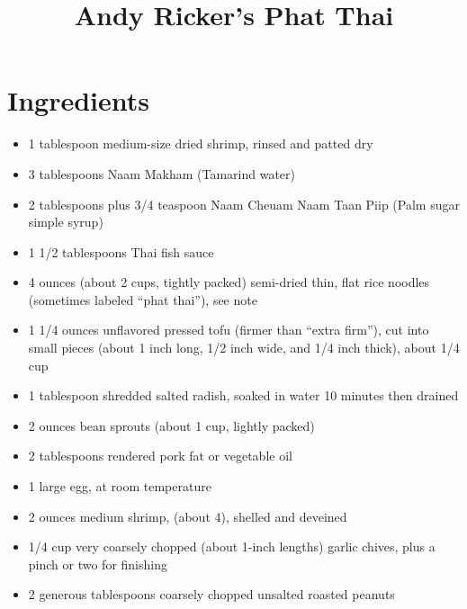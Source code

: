 \documentclass[11pt,letterpaper]{article}
\title{Andy Ricker's Phat Thai}
\date{}
\begin{document}
\maketitle

\section*{Ingredients}
\begin{multicols}{2}
    \begin{itemize}
        \item 1 tablespoon medium-size dried shrimp, rinsed and patted dry
        \item 3 tablespoons Naam Makham (Tamarind water)
        \item 2 tablespoons plus 3/4 teaspoon Naam Cheuam Naam Taan Piip (Palm sugar simple syrup)
        \item 1 1/2 tablespoons Thai fish sauce
        \item 4 ounces (about 2 cups, tightly packed) semi-dried thin, flat rice noodles (sometimes labeled “phat thai”), see note
        \item 1 1/4 ounces unflavored pressed tofu (firmer than “extra firm”), cut into small pieces (about 1 inch long, 1/2 inch wide, and 1/4 inch thick), about 1/4 cup
    \end{itemize}
    \columnbreak
    \begin{itemize}
        \item 1 tablespoon shredded salted radish, soaked in water 10 minutes then drained
        \item 2 ounces bean sprouts (about 1 cup, lightly packed)
        \item 2 tablespoons rendered pork fat or vegetable oil
        \item 1 large egg, at room temperature
        \item 2 ounces medium shrimp, (about 4), shelled and deveined
        \item 1/4 cup very coarsely chopped (about 1-inch lengths) garlic chives, plus a pinch or two for finishing
        \item 2 generous tablespoons coarsely chopped unsalted roasted peanuts
    \end{itemize}
\end{multicols}
\end{document}
